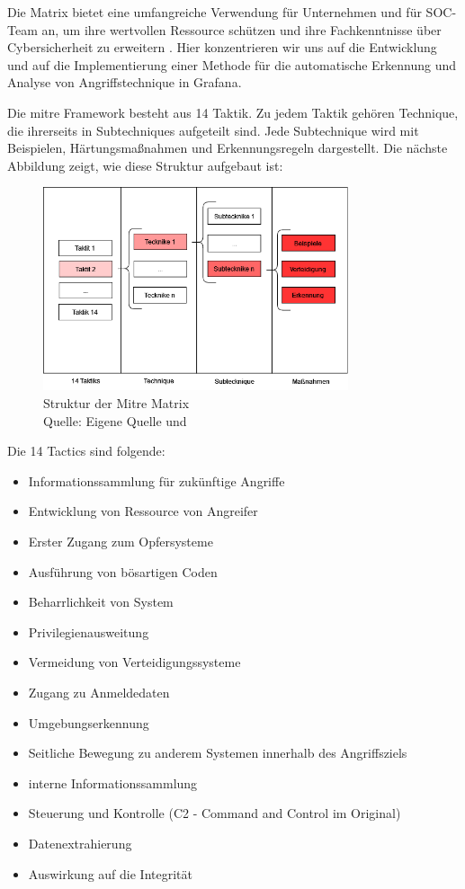 Die Matrix bietet eine umfangreiche Verwendung für Unternehmen und für \gls{SOC}-Team an, um ihre wertvollen Ressource schützen und ihre Fachkenntnisse über \gls{Cybersicherheit} zu erweitern \citep{Hazel_howtousemitre}. Hier konzentrieren wir uns auf die Entwicklung und auf die Implementierung einer Methode für die automatische Erkennung und Analyse von Angriffstechnique in Grafana.

Die \gls{mitre} Framework besteht aus 14 Taktik. Zu jedem Taktik gehören Technique, die ihrerseits in Subtechniques aufgeteilt sind. Jede Subtechnique wird mit Beispielen, Härtungsmaßnahmen und Erkennungsregeln dargestellt. Die nächste Abbildung zeigt, wie diese Struktur aufgebaut ist: 

\begin{figure}[H]
   \centering
   \includegraphics[width=0.8\textwidth]{assets/Mitre_structure.drawio.png}
   \caption{Struktur der Mitre Matrix \\Quelle: Eigene Quelle und \citep{Mitre_Started}}
   \centering
\end{figure}

{
Die 14 Tactics sind folgende:
\begin{itemize}[noitemsep]
   \item Informationssammlung für zukünftige Angriffe 
   \item	Entwicklung von Ressource von Angreifer
   \item Erster Zugang zum Opfersysteme 
   \item Ausführung von bösartigen Coden
   \item Beharrlichkeit von System
   \item	Privilegienausweitung
   \item Vermeidung von Verteidigungssysteme
   \item Zugang zu Anmeldedaten
   \item Umgebungserkennung
   \item Seitliche Bewegung zu anderem Systemen innerhalb des Angriffsziels
   \item interne Informationssammlung
   \item Steuerung und Kontrolle (C2 - Command and Control im Original)
   \item Datenextrahierung 
   \item	Auswirkung auf die Integrität
\end{itemize}
}

